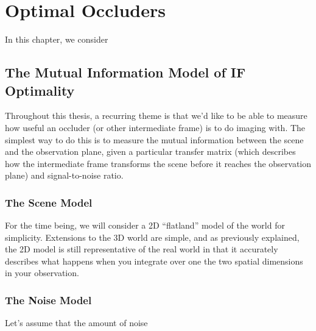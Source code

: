 \chapter{Optimal Occluders}

In this chapter, we consider 

\section{The Mutual Information Model of IF Optimality}

Throughout this thesis, a recurring theme is that we'd like to be able to measure how useful an occluder (or other intermediate frame) is to do imaging with. The simplest way to do this is to measure the mutual information between the scene and the observation plane, given a particular transfer matrix (which describes how the intermediate frame transforms the scene before it reaches the observation plane) and signal-to-noise ratio.

\subsection{The Scene Model}

For the time being, we will consider a 2D ``flatland'' model of the world for simplicity. Extensions to the 3D world are simple, and as previously explained, the 2D model is still representative of the real world in that it accurately describes what happens when you integrate over one the two spatial dimensions in your observation.



\subsection{The Noise Model}

Let's assume that the amount of noise 


